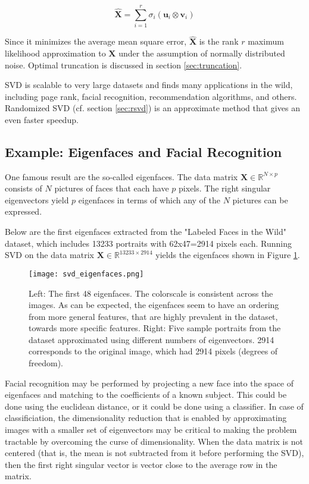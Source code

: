 \begin{equation}
\mathbf{\hat{X}} = \sum_{i=1}^r \sigma_i (\mathbf{u}_i \otimes \mathbf{v}_i)
\end{equation}

Since it minimizes the average mean square error, $\mathbf{\hat{X}}$ is the rank $r$ maximum likelihood approximation to $\mathbf{X}$ under the assumption of normally distributed noise. Optimal truncation is discussed in section \ref{sec:truncation}.

SVD is scalable to very large datasets and finds many applications in the wild, including page rank, facial recognition, recommendation algorithms, and others. Randomized SVD (cf. section \ref{sec:rsvd}) is an approximate method that gives an even faster speedup.


\subsection{Example: Eigenfaces and Facial Recognition}
One famous result are the so-called eigenfaces. The data matrix $\mathbf{X}\in\mathbb{R}^{N\times p}$ consists of $N$ pictures of faces that each have $p$ pixels. The right singular eigenvectors yield $p$ eigenfaces in terms of which any of the $N$ pictures can be expressed. 

Below are the first eigenfaces extracted from the "Labeled Faces in the Wild" dataset, which includes 13233 portraits with 62x47=2914 pixels each. Running SVD on the data matrix $\mathbf{X} \in \mathbb{R}^{13233\times 2914}$ yields the eigenfaces shown in Figure \ref{fig:svd_eigenfaces}.

\begin{figure}
\centering
    \texttt{[image: svd\_eigenfaces.png]}
    \caption{Left: The first 48 eigenfaces. The colorscale is consistent across the images. As can be expected, the eigenfaces seem to have an ordering from more general features, that are highly prevalent in the dataset, towards more specific features. Right: Five sample portraits from the dataset approximated using different numbers of eigenvectors. 2914 corresponds to the original image, which had 2914 pixels (degrees of freedom).}
    \label{fig:svd_eigenfaces}
\end{figure}

Facial recognition may be performed by projecting a new face into the space of eigenfaces and matching to the coefficients of a known subject. This could be done using the euclidean distance, or it could be done using a classifier. In case of classificiation, the dimensionality reduction that is enabled by approximating images with a smaller set of eigenvectors may be critical to making the problem tractable by overcoming the curse of dimensionality. When the data matrix is not centered (that is, the mean is not subtracted from it before performing the SVD), then the first right singular vector is vector close to the average row in the matrix.


